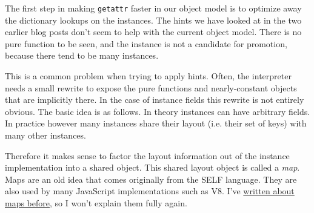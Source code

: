 \documentclass{sig-alternate}
\begin{document}
The first step in making \texttt{getattr} faster in our object model is to optimize
away the dictionary lookups on the instances. The hints we have looked at in the
two earlier blog posts don't seem to help with the current object model. There is
no pure function to be seen, and the instance is not a candidate for promotion,
because there tend to be many instances.

This is a common problem when trying to apply hints. Often, the interpreter
needs a small rewrite to expose the pure functions and nearly-constant objects
that are implicitly there. In the case of instance fields this rewrite is not
entirely obvious. The basic idea is as follows. In theory instances can have
arbitrary fields. In practice however many instances share their layout (i.e.
their set of keys) with many other instances.

Therefore it makes sense to factor the layout information out of the instance
implementation into a shared object. This shared layout object is called a
\emph{map}. Maps are an old idea that comes originally from the SELF language. They are
also used by many JavaScript implementations such as V8. I've \href{http://morepypy.blogspot.com/2010/11/efficiently-implementing-python-objects.html}{written about maps
before}, so I won't explain them fully again.
\end{document}
